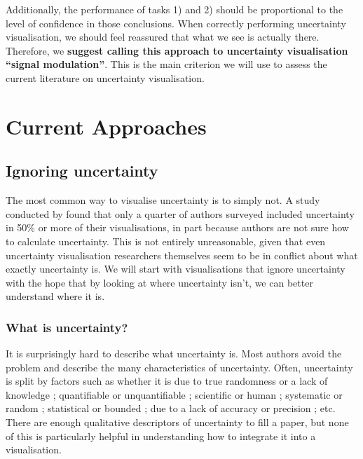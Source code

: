 \documentclass[]{ar-1col-S2O}
\begin{document}
Additionally, the performance of tasks 1) and 2) should be proportional
to the level of confidence in those conclusions. When correctly
performing uncertainty visualisation, we should feel reassured that what
we see is actually there. Therefore, we \textbf{suggest calling this
approach to uncertainty visualisation ``signal modulation''}. This is
the main criterion we will use to assess the current literature on
uncertainty visualisation.

\section{Current Approaches}\label{current-approaches}

\subsection{Ignoring uncertainty}\label{ignoring-uncertainty}

The most common way to visualise uncertainty is to simply not. A study
conducted by \citet{Hullman2020a} found that only a quarter of authors
surveyed included uncertainty in 50\% or more of their visualisations,
in part because authors are not sure how to calculate uncertainty. This
is not entirely unreasonable, given that even uncertainty visualisation
researchers themselves seem to be in conflict about what exactly
uncertainty is. We will start with visualisations that ignore
uncertainty with the hope that by looking at where uncertainty isn't, we
can better understand where it is.

\subsubsection{What is uncertainty?}\label{what-is-uncertainty}

It is surprisingly hard to describe what uncertainty is. Most authors
avoid the problem and describe the many characteristics of uncertainty.
Often, uncertainty is split by factors such as whether it is due to true
randomness or a lack of knowledge
\citep{Begg2014, Spiegelhalter2017, Gustafson2019, uncertchap2022, Hullman2016, utypo};
quantifiable or unquantifiable
\citep{Spiegelhalter2017, utypo, uncertchap2022}; scientific or human
\citep{Benjamin2018, Gustafson2019}; systematic or random
\citep{Sanyal2009}; statistical or bounded
\citep{Gschwandtnei2016, Olston2002}; due to a lack of accuracy or
precision \citep{Griethe2006, Benjamin2018, Hullman2016}; etc. There are
enough qualitative descriptors of uncertainty to fill a paper, but none
of this is particularly helpful in understanding how to integrate it
into a visualisation.
\end{document}
